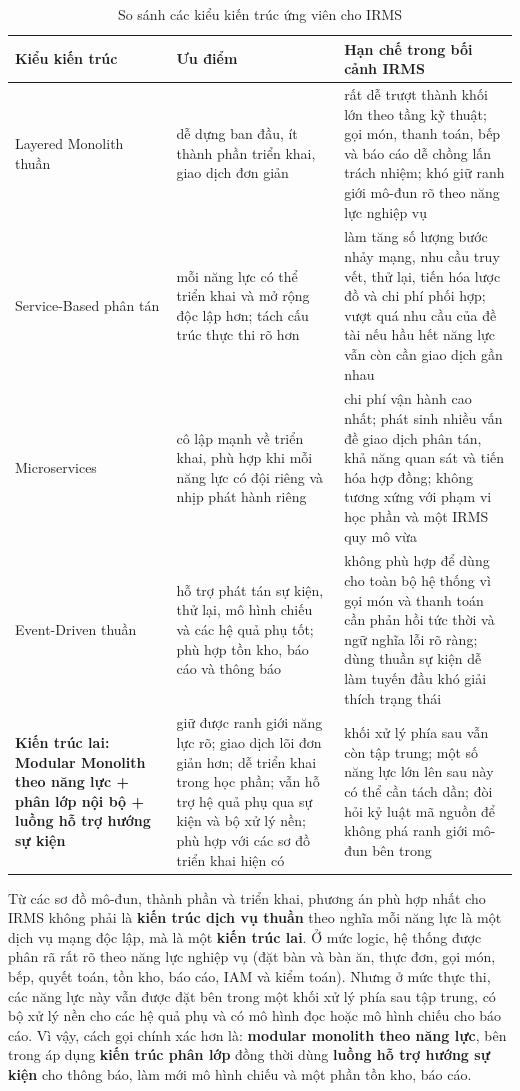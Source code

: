 \documentclass[11pt,a4paper]{article}
\begin{document}
\begin{table}[H]
\centering
\caption{So sánh các kiểu kiến trúc ứng viên cho IRMS}
\begin{tabularx}{\textwidth}{|p{3.2cm}|p{3.3cm}|X|}
\hline
\textbf{Kiểu kiến trúc} & \textbf{Ưu điểm} & \textbf{Hạn chế trong bối cảnh IRMS} \\
\hline
Layered Monolith thuần & dễ dựng ban đầu, ít thành phần triển khai, giao dịch đơn giản & rất dễ trượt thành khối lớn theo tầng kỹ thuật; gọi món, thanh toán, bếp và báo cáo dễ chồng lấn trách nhiệm; khó giữ ranh giới mô-đun rõ theo năng lực nghiệp vụ \\
\hline
Service-Based phân tán & mỗi năng lực có thể triển khai và mở rộng độc lập hơn; tách cấu trúc thực thi rõ hơn & làm tăng số lượng bước nhảy mạng, nhu cầu truy vết, thử lại, tiến hóa lược đồ và chi phí phối hợp; vượt quá nhu cầu của đề tài nếu hầu hết năng lực vẫn còn cần giao dịch gần nhau \\
\hline
Microservices & cô lập mạnh về triển khai, phù hợp khi mỗi năng lực có đội riêng và nhịp phát hành riêng & chi phí vận hành cao nhất; phát sinh nhiều vấn đề giao dịch phân tán, khả năng quan sát và tiến hóa hợp đồng; không tương xứng với phạm vi học phần và một IRMS quy mô vừa \\
\hline
Event-Driven thuần & hỗ trợ phát tán sự kiện, thử lại, mô hình chiếu và các hệ quả phụ tốt; phù hợp tồn kho, báo cáo và thông báo & không phù hợp để dùng cho toàn bộ hệ thống vì gọi món và thanh toán cần phản hồi tức thời và ngữ nghĩa lỗi rõ ràng; dùng thuần sự kiện dễ làm tuyến đầu khó giải thích trạng thái \\
\hline
\textbf{Kiến trúc lai: Modular Monolith theo năng lực + phân lớp nội bộ + luồng hỗ trợ hướng sự kiện} & giữ được ranh giới năng lực rõ; giao dịch lõi đơn giản hơn; dễ triển khai trong học phần; vẫn hỗ trợ hệ quả phụ qua sự kiện và bộ xử lý nền; phù hợp với các sơ đồ triển khai hiện có & khối xử lý phía sau vẫn còn tập trung; một số năng lực lớn lên sau này có thể cần tách dần; đòi hỏi kỷ luật mã nguồn để không phá ranh giới mô-đun bên trong \\
\hline
\end{tabularx}
\end{table}

Từ các sơ đồ mô-đun, thành phần và triển khai, phương án phù hợp nhất cho IRMS không phải là
\textbf{kiến trúc dịch vụ thuần} theo nghĩa mỗi năng lực là một dịch vụ mạng độc lập,
mà là một \textbf{kiến trúc lai}.
Ở mức logic, hệ thống được phân rã rất rõ theo năng lực nghiệp vụ
(đặt bàn và bàn ăn, thực đơn, gọi món, bếp, quyết toán, tồn kho, báo cáo, IAM và kiểm toán).
Nhưng ở mức thực thi, các năng lực này vẫn được đặt bên trong một khối xử lý phía sau tập trung,
có bộ xử lý nền cho các hệ quả phụ
và có mô hình đọc hoặc mô hình chiếu cho báo cáo.
Vì vậy, cách gọi chính xác hơn là:
\textbf{modular monolith theo năng lực},
bên trong áp dụng
\textbf{kiến trúc phân lớp}
đồng thời dùng
\textbf{luồng hỗ trợ hướng sự kiện}
cho thông báo, làm mới mô hình chiếu và một phần tồn kho, báo cáo.
\end{document}
